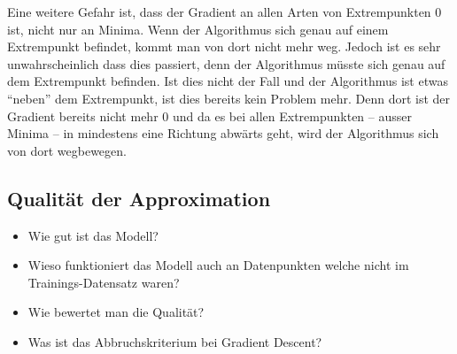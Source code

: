 Eine weitere Gefahr ist, dass der Gradient an allen Arten von Extrempunkten 0 ist, nicht nur an Minima.
Wenn der Algorithmus sich genau auf einem Extrempunkt befindet, kommt man von dort nicht mehr weg.
Jedoch ist es sehr unwahrscheinlich dass dies passiert, denn der Algorithmus müsste sich genau auf dem Extrempunkt befinden.
Ist dies nicht der Fall und der Algorithmus ist etwas ``neben'' dem Extrempunkt, ist dies bereits kein Problem mehr.
Denn dort ist der Gradient bereits nicht mehr 0 und da es bei allen Extrempunkten -- ausser Minima -- in mindestens eine Richtung abwärts geht, wird der Algorithmus sich von dort wegbewegen.


\subsection{Qualität der Approximation}\label{neuronal:subsection:qualität_nn}

\begin{itemize}
    \item Wie gut ist das Modell?
    \item Wieso funktioniert das Modell auch an Datenpunkten welche nicht im Trainings-Datensatz waren?
    \item Wie bewertet man die Qualität?
    \item Was ist das Abbruchskriterium bei Gradient Descent?
\end{itemize}
